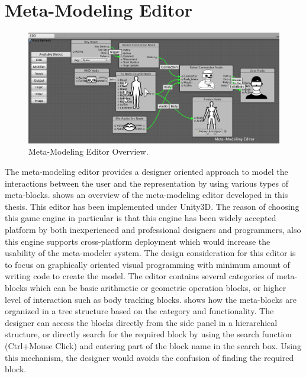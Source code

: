 \section{Meta-Modeling Editor}

\begin{figure}[b!]
\centering
\captionsetup{justification=centering} 
\includegraphics[width=1\textwidth]{figures/system/MetaEditor.png}
\caption{Meta-Modeling Editor Overview.}
  \label{fig:system-metaeditor}
\end{figure}

The meta-modeling editor provides a designer oriented approach to model the interactions between the user and the representation by using various types of meta-blocks.  shows an overview of the meta-modeling editor developed in this thesis. This editor has been implemented under Unity3D. The reason of choosing this game engine in particular is that this engine has been widely accepted platform by both inexperienced and professional designers and programmers, also this engine supports cross-platform deployment which would increase the usability of the meta-modeler system. The design consideration for this editor is to focus on graphically oriented visual programming with minimum amount of writing code to create the model. The editor contains several categories of meta-blocks which can be basic arithmetic or geometric operation blocks, or higher level of interaction such as body tracking blocks.  shows how the meta-blocks are organized in a tree structure based on the category and functionality. The designer can access the blocks directly from the side panel in a hierarchical structure, or directly search for the required block by using the search function (Ctrl+Mouse Click) and entering part of the block name in the search box. Using this mechanism, the designer would avoids the confusion of finding the required block. 

